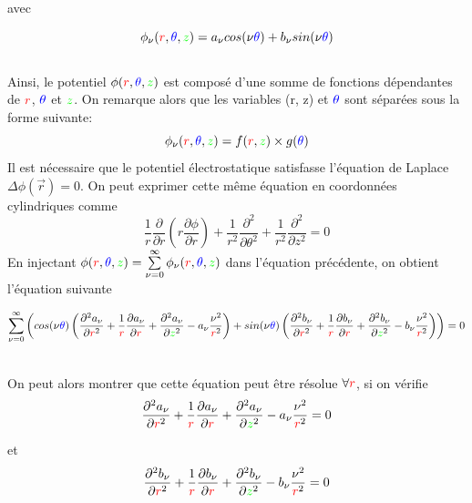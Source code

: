 \documentclass{report}
\begin{document}
avec 

\[
\phi_\nu ({\color{red}r},{\color{blue}\theta},{\color{green}z})=a_\nu cos(\nu{\color{blue}\theta})+b_\nu sin(\nu {\color{blue}\theta})
\]
\\ 
Ainsi, le potentiel $\phi ({\color{red}r},{\color{blue}\theta},{\color{green}z})$ est composé d'une somme de fonctions dépendantes de 
${\color{red}r}$, ${\color{blue}\theta}$ et ${\color{green}z}$. On remarque alors que les variables 
({\color{red}r}, {\color{green}z}) et ${\color{blue}\theta}$ sont séparées sous la forme suivante: 
\[
\phi_\nu ({\color{red}r},{\color{blue}\theta},{\color{green}z})=f({\color{red}r},{\color{green}z})\times g({\color{blue}\theta})
\]
Il est nécessaire que le potentiel électrostatique satisfasse l'équation de Laplace $\Delta \phi(\vec{r})=0$. On peut
exprimer cette même équation en coordonnées cylindriques comme  
\[
\frac{1}{r} \frac{\partial}{\partial r} \left(r \frac{\partial \phi}{\partial r} \right) + \frac{1}{r^2} \frac{\partial^{2}}{\partial \theta ^2}
+ \frac{1}{r^2} \frac{\partial^{2}}{\partial z ^2}=0
\]
En injectant $\phi ({\color{red}r},{\color{blue}\theta},{\color{green}z})=\sum\limits_{\nu =0}^{\infty} \phi_\nu ({\color{red}r},{\color{blue}\theta},{\color{green}z})$
dans l'équation précédente, on obtient l'équation suivante

\[
\sum\limits_{\nu =0}^{\infty} \left(cos(\nu {\color{blue}\theta}) \left(\frac{\partial^{2} a_\nu}{\partial {\color{red}r}^2} + \frac{1}{{\color{red}r}} 
\frac{\partial a_\nu}{\partial {\color{red}r}} + \frac{\partial^{2} a_\nu}{\partial {\color{green}z}^2} - a_\nu \frac{\nu ^2}{{\color{red}r}^2}\right) 
+ sin(\nu {\color{blue}\theta}) \left(\frac{\partial^{2} b_\nu}{\partial {\color{red}r}^2} + \frac{1}{{\color{red}r}} \frac{\partial b_\nu}{\partial {\color{red}r}} 
+ \frac{\partial^{2} b_\nu}{\partial {\color{green}z}^2}- b_\nu \frac{\nu ^2}{{\color{red}r}^2}\right)\right) = 0
\]

\
\\
On peut alors montrer que cette équation peut être résolue $\forall {\color{red}r}$, si on vérifie
\[
\frac{\partial^{2} a_\nu}{\partial {\color{red}r}^2} + \frac{1}{{\color{red}r}} 
\frac{\partial a_\nu}{\partial {\color{red}r}} + \frac{\partial^{2} a_\nu}{\partial {\color{green}z}^2} - a_\nu \frac{\nu ^2}{{\color{red}r}^2}=0
\]

et 
\[
\frac{\partial^{2} b_\nu}{\partial {\color{red}r}^2} + \frac{1}{{\color{red}r}} \frac{\partial b_\nu}{\partial {\color{red}r}} 
+ \frac{\partial^{2} b_\nu}{\partial {\color{green}z}^2}- b_\nu \frac{\nu ^2}{{\color{red}r}^2}=0 
\]
\end{document}
